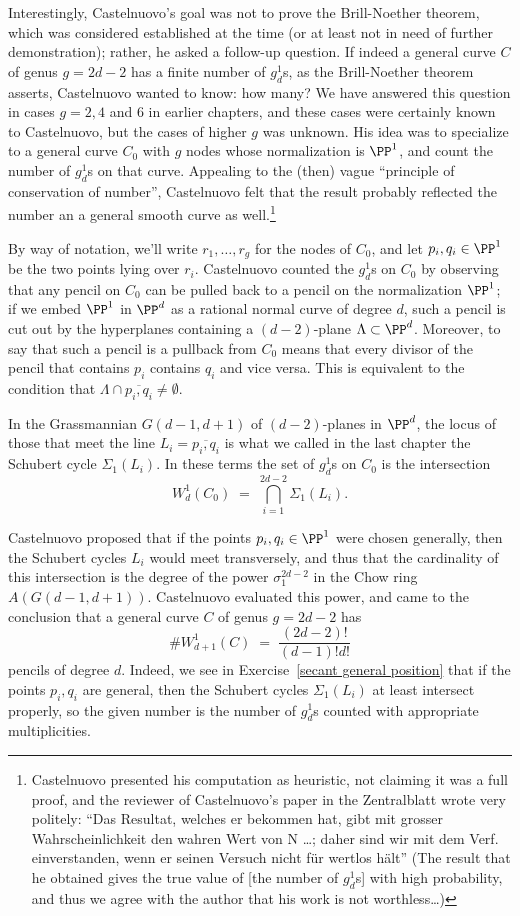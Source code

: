 Interestingly, Castelnuovo's goal was not to prove the Brill-Noether theorem, which was considered established at the time (or at least not in need of further demonstration); rather, he asked a follow-up question. If indeed a general curve $C$ of genus $g = 2d-2$ has a finite number of $g^1_d$s, as the Brill-Noether theorem asserts, Castelnuovo wanted to know: how many? We have answered this question in cases $g = 2, 4$ and 6 in earlier chapters, and these cases were certainly known to Castelnuovo, but the cases of higher $g$ was unknown.
 His idea was to specialize to a general curve $C_0$ with $g$ nodes  whose normalization is $\PP^1$, and count the number of $g^1_d$s on that curve. Appealing to the (then) vague ``principle of conservation of number'', Castelnuovo felt that the result probably reflected the number an a general smooth curve as well.\footnote{Castelnuovo presented his computation as heuristic, not claiming it was a full proof, and the reviewer of Castelnuovo's paper in the Zentralblatt wrote very politely:
``Das Resultat, welches er bekommen hat, gibt mit grosser Wahrscheinlichkeit den wahren Wert von N \dots; daher sind wir mit dem Verf. einverstanden, wenn er seinen Versuch nicht für wertlos hält''
(The result that he obtained gives the true value of [the number of $g^1_d$s] with high probability, and thus we agree with the author that his work is not worthless\dots)}  

By way of notation, we'll write $r_1,\dots,r_g$ for the nodes of $C_0$, and let $p_i, q_i \in \PP^1$ be the two points lying over $r_i$.
Castelnuovo counted the $g^1_d$s on $C_0$ by observing that any pencil on $C_0$ can be pulled back to a pencil on the normalization $\PP^1$; if we embed $\PP^1$ in $\PP^d$ as a rational normal curve of degree $d$, such a pencil is cut out by the hyperplanes containing
 a $(d-2)$-plane $\Lambda \subset \PP^d$. Moreover, to say that such a pencil is a pullback from $C_0$ means that every divisor of the pencil that contains $p_i$ contains $q_i$ and vice versa. This  is equivalent to the condition that $\Lambda \cap \overline{p_i,q_i} \neq \emptyset$.

In the Grassmannian $G(d-1, d+1)$ of $(d-2)$-planes in $\PP^d$, the locus of those that meet the line $L_i = \overline{p_i,q_i}$ is what we called in the last chapter the Schubert cycle $\Sigma_1(L_i)$. In these terms the set of $g^1_d$s on $C_0$ is the intersection
$$
W^1_d(C_0) \; = \; \bigcap_{i=1}^{2d-2} \Sigma_1(L_i).
$$

Castelnuovo proposed that if the points $p_i, q_i\in \PP^1$ were chosen generally, then the Schubert cycles
$L_i$ would meet transversely, and thus that the cardinality of this intersection is the degree of the power $\sigma_1^{2d-2}$ in the Chow ring $A(G(d-1, d+1))$. Castelnuovo evaluated this power, and came to the conclusion that a general curve $C$ of genus $g=2d-2$ has 
$$
\#W^1_{d+1}(C) \; = \; \frac{(2d-2)!}{(d-1)!d!}
$$
pencils of degree $d$. Indeed, we see
 in Exercise~\ref{secant general position} that if the points $p_i, q_i$ are general, then the Schubert cycles $\Sigma_1(L_i)$ at least intersect properly, so the given number is the number of $g^1_d$s counted with appropriate multiplicities.

